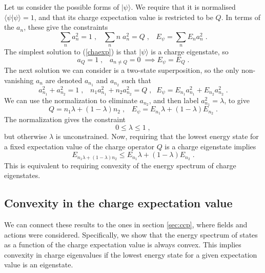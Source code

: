 \documentclass[11pt]{article}
\numberwithin{equation}{section}
\newcommand{\be}{\begin{equation}} \newcommand{\ee}{\end{equation}}
\begin{document}
	Let us consider the possible forms of $|\psi \rangle$. We require that it is normalised $\langle \psi | \psi \rangle=1$, and that its charge expectation value is restricted to be $Q$. In terms of the $a_n$, these give the constraints
	\be
	\sum_n a^2_n = 1 \;,\;\;\; \sum_n n \;a_n^2 = Q \;,\;\;\; E_{\psi} = \sum_n E_n a_n^2 \;.
	\label{chaexp}
	\ee
	The simplest solution to (\ref{chaexp}) is that $|\psi\rangle$ is a charge eigenstate, so 	
	\be
	a_Q = 1 \;,\;\;\; a_{n\neq Q} = 0  \;\implies E_{\psi} = E_Q \;.
	\label{cheg}
	\ee
	The next solution we can consider is a two-state superposition, so the only non-vanishing $a_n$ are denoted $a_{n_1}$ and $a_{n_2}$ such that
	\be
	a_{n_1}^2 + a_{n_2}^2 = 1 \;,\;\;\; n_1 a_{n_1}^2 + n_2 a_{n_2}^2 = Q \;,\;\; E_{\psi} = E_{n_1} a_{n_1}^2 + E_{n_2} a_{n_2}^2\;. 
	\ee
	We can use the normalization to eliminate $a_{n_2}$, and then label $a_{n_1}^2=\lambda$, to give
	\be
	Q = n_1 \lambda + \left(1-\lambda\right) n_2 \;, \;\;\; E_{\psi} = E_{n_1} \lambda + \left(1-\lambda\right) E_{n_2} \;.
	\ee
	The normalization gives the constraint
	\be
	0 \leq \lambda \leq 1 \;,
	\label{lamrng}
	\ee
	but otherwise $\lambda$ is unconstrained. Now, requiring that the lowest energy state for a fixed expectation value of the charge operator $Q$ is a charge eigenstate implies
	\be
	E_{n_1 \lambda + \left(1-\lambda\right) n_2} \leq  E_{n_1} \lambda + \left(1-\lambda\right) E_{n_2} \;.
	\label{purcon}
	\ee
	This is equivalent to requiring convexity of the energy spectrum of charge eigenstates. 
	
	
\subsection{Convexity in the charge expectation value}
\label{sec:cce2}

We can connect these results to the ones in section \ref{sec:ccp}, where fields and actions were considered. Specifically, we show that the energy spectrum of states as a function of the charge expectation value is always convex. This implies convexity in charge eigenvalues if the lowest energy state for a given expectation value is an eigenstate. 
\end{document}
